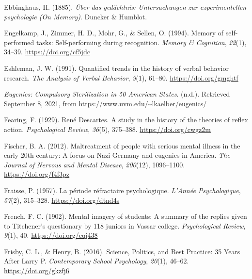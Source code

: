\documentclass[
  oneside,
  12pt]{crumpbook}
\newlength{\cslhangindent}
\newlength{\cslentryspacingunit} %
\newenvironment{CSLReferences}[2] %
 {%
  \setlength{\parindent}{0pt}
  \ifodd #1
  \let\oldpar\par
  \def\par{\hangindent=\cslhangindent\oldpar}
  \fi
  \setlength{\parskip}{#2\cslentryspacingunit}
 }%
 {}
\begin{document}
\begin{CSLReferences}{1}{0}
\leavevmode{}%
Ebbinghaus, H. (1885). \emph{Über das gedächtnis: Untersuchungen zur experimentellen psychologie ({On Memory})}. {Duncker \& Humblot}.

\leavevmode{}%
Engelkamp, J., Zimmer, H. D., Mohr, G., \& Sellen, O. (1994). Memory of self-performed tasks: {Self}-performing during recognition. \emph{Memory \& Cognition}, \emph{22}(1), 34--39. \url{https://doi.org/cf5jdc}

\leavevmode{}%
Eshleman, J. W. (1991). Quantified trends in the history of verbal behavior research. \emph{The Analysis of Verbal Behavior}, \emph{9}(1), 61--80. \url{https://doi.org/gmghtf}

\leavevmode{}%
\emph{Eugenics: {Compulsory Sterilization} in 50 {American States}}. (n.d.). Retrieved September 8, 2021, from \url{https://www.uvm.edu/~lkaelber/eugenics/}

\leavevmode{}%
Fearing, F. (1929). René {Descartes}. {A} study in the history of the theories of reflex action. \emph{Psychological Review}, \emph{36}(5), 375--388. \url{https://doi.org/cwgz2m}

\leavevmode{}%
Fischer, B. A. (2012). Maltreatment of people with serious mental illness in the early 20th century: A focus on {Nazi Germany} and eugenics in {America}. \emph{The Journal of Nervous and Mental Disease}, \emph{200}(12), 1096--1100. \url{https://doi.org/f4f3pz}

\leavevmode{}%
Fraisse, P. (1957). La période réfractaire psychologique. \emph{L'Année Psychologique}, \emph{57}(2), 315--328. \url{https://doi.org/dtnd4s}

\leavevmode{}%
French, F. C. (1902). Mental imagery of students: {A} summary of the replies given to {Titchener}'s questionary by 118 juniors in {Vassar} college. \emph{Psychological Review}, \emph{9}(1), 40. \url{https://doi.org/cqj438}

\leavevmode{}%
Frisby, C. L., \& Henry, B. (2016). Science, {Politics}, and {Best Practice}: 35 {Years After Larry P}. \emph{Contemporary School Psychology}, \emph{20}(1), 46--62. \url{https://doi.org/gkzfj6}


\end{CSLReferences}
\end{document}
